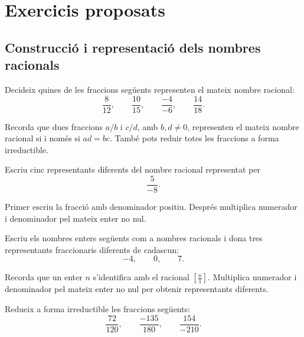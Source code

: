 \chapter{Exercicis proposats}
\label{cap:exercicis-proposats}

\section{Construcció i representació dels nombres racionals}

\begin{exercici}
	Decideix quines de les fraccions següents representen el mateix nombre racional:
	\[
	\frac{8}{12},
	\qquad
	\frac{10}{15},
	\qquad
	\frac{-4}{-6},
	\qquad
	\frac{14}{18}.
	\]
\end{exercici}

\begin{indicacio}
	Recorda que dues fraccions \(a/b\) i \(c/d\), amb \(b,d\neq0\), representen el mateix nombre racional si i només si \(ad=bc\). També pots reduir totes les fraccions a forma irreductible.
\end{indicacio}

\begin{exercici}
	Escriu cinc representants diferents del nombre racional representat per
	\[
	\frac{5}{-8}.
	\]
\end{exercici}

\begin{indicacio}
	Primer escriu la fracció amb denominador positiu. Després multiplica numerador i denominador pel mateix enter no nul.
\end{indicacio}

\begin{exercici}
	Escriu els nombres enters següents com a nombres racionals i dona tres representants fraccionaris diferents de cadascun:
	\[
	-4,
	\qquad
	0,
	\qquad
	7.
	\]
\end{exercici}

\begin{indicacio}
	Recorda que un enter \(n\) s'identifica amb el racional \(\left[\frac{n}{1}\right]\). Multiplica numerador i denominador pel mateix enter no nul per obtenir representants diferents.
\end{indicacio}

\begin{exercici}
	Redueix a forma irreductible les fraccions següents:
	\[
	\frac{72}{120},
	\qquad
	\frac{-135}{180},
	\qquad
	\frac{154}{-210}.
	\]
\end{exercici}

